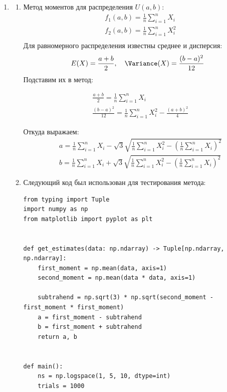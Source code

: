 \documentclass{article}
\begin{document}
\begin{enumerate}
	      Тогда оптимальной оценкой для $\theta$ является
	      \[
		      \widehat{\theta} = \frac{n+1}{n} X_{(n)}
	      \]

	\item
	      \begin{enumerate}
		      \item[(a)] Метод моментов для распределения $U(a, b)$:
			      \begin{align*}
				       & f_1(a, b) = \frac{1}{n} \sum_{i=1}^n X_i   \\
				       & f_2(a, b) = \frac{1}{n} \sum_{i=1}^n X_i^2 \\
			      \end{align*}
			      Для равномерного распределения известны среднее и дисперсия:
			      \[
				      E(X) = \frac{a + b}{2}, \quad \Variance(X) = \frac{(b - a)^2}{12}
			      \]
			      Подставим их в метод:

			      \begin{align*}
				       & \frac{a + b}{2} = \frac{1}{n} \sum_{i=1}^n X_i                              \\
				       & \frac{(b - a)^2}{12} = \frac{1}{n} \sum_{i=1}^n X_i^2 - \frac{(a + b)^2}{4}
			      \end{align*}

			      Откуда выражаем:
			      \begin{align*}
				       & a = \frac{1}{n} \sum_{i=1}^n X_i - \sqrt{3} \sqrt{\frac{1}{n} \sum_{i=1}^n X_i^2 - \left(\frac{1}{n} \sum_{i=1}^n X_i\right)^2} \\
				       & b = \frac{1}{n} \sum_{i=1}^n X_i + \sqrt{3} \sqrt{\frac{1}{n} \sum_{i=1}^n X_i^2 - \left(\frac{1}{n} \sum_{i=1}^n X_i\right)^2}
			      \end{align*}

		      \item[(b)]
			      Следующий код был использован для тестирования метода:
			      \begin{lstlisting}
from typing import Tuple
import numpy as np
from matplotlib import pyplot as plt


def get_estimates(data: np.ndarray) -> Tuple[np.ndarray, np.ndarray]:
    first_moment = np.mean(data, axis=1)
    second_moment = np.mean(data * data, axis=1)

    subtrahend = np.sqrt(3) * np.sqrt(second_moment - first_moment * first_moment)
    a = first_moment - subtrahend
    b = first_moment + subtrahend
    return a, b


def main():
    ns = np.logspace(1, 5, 10, dtype=int)
    trials = 1000


\end{lstlisting}
\end{enumerate}
\end{enumerate}
\end{document}
